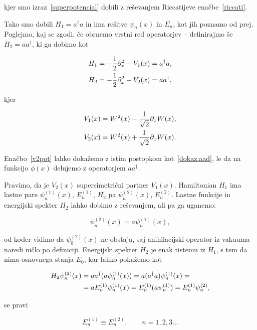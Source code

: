 \ni kjer smo izraz~\eqref{superpotencial} dobili z re\v sevanjem Riccatijeve ena\v cbe~\eqref{riccati}.

Tako smo dobili $H_1 = a^\dagger a$ in ima re\v sitve $\psi_n(x)$ in $E_n$, kot jih poznamo
od prej. Poglejmo, kaj se zgodi, \v ce obrnemo vrstni red operatorjev -- definirajmo \v se $H_2 = aa^\dagger$,
ki ga dobimo kot

\begin{align}
	H_1 &= -\frac{1}{2}\partial_x^2 + V_1(x) = a^\dagger a, \\
	H_2 &= -\frac{1}{2}\partial_x^2 + V_2(x) = aa^\dagger,
\end{align}

\ni kjer

\begin{align}
	V_1(x) &= W^2(x) - \frac{1}{\sqrt{2}}\partial_x W(x), \notag \\
	V_2(x) &= W^2(x) + \frac{1}{\sqrt{2}}\partial_x W(x). \label{v2pot}
\end{align}

\ni Ena\v cbo~\eqref{v2pot} lahko doka\v zemo z istim postopkom kot~\eqref{dokaz.aad}, le da na funkcijo $\phi(x)$
delujemo z operatorjem $aa^\dagger$.

Pravimo, da je $V_2(x)$ supersimetri\v cni partner $V_1(x)$. Hamiltonian $H_1$ ima lastne pare $\psi^{(1)}_n(x)$,
$E^{(1)}_n$, $H_2$ pa $\psi^{(2)}_n(x)$, $E^{(2)}_n$. Lastne funkcije in energijski spekter $H_2$ lahko dobimo z
re\v sevanjem, ali pa ga uganemo:

\begin{equation}
	\psi^{(2)}_n(x) = a\psi^{(1)}_n(x),
\end{equation}

od koder vidimo da $\psi^{(2)}_0(x)$ ne obstaja, saj anihilacijski operator iz vakuuma naredi
ni\v clo po definiciji. Energijski spekter $H_2$ je enak tistemu iz $H_1$, s tem da nima
osnovnega stanja $E_0$, kar lahko poka\v zemo kot

\begin{align}
	H_2\psi^{(2)}_n(x) &= aa^\dagger (a\psi^{(1)}_n(x)) = a(a^\dagger a)\psi^{(1)}_n(x) = \notag \\
		&= aE^{(1)}_n\psi^{(1)}_n(x) = E_n^{(1)}(a\psi_n^{(1)}) = E_n^{(1)}\psi_n^{(2)},
	\label{degenener}
\end{align}

\ni se pravi

\begin{equation}
	E^{(1)}_n \equiv E^{(2)}_n, \qquad n = 1, 2, 3 \ldots
\end{equation}

